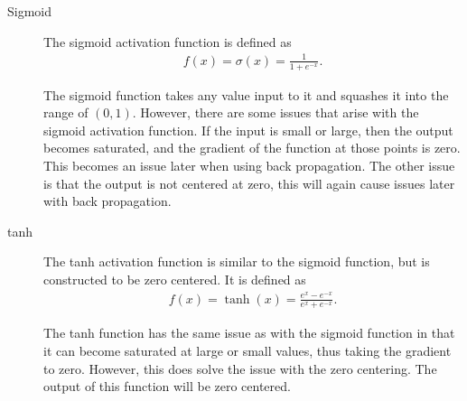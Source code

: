 \documentclass[10pt]{amsart}
\newenvironment{Figure}
{\par\medskip\noindent\minipage{\linewidth}}
{\endminipage\par\medskip}
\begin{document}
\begin{multicols}{2}
  \begin{description}
    \item[Sigmoid] The sigmoid activation function is defined as
      \begin{align*}
        f(x)=\sigma(x)=\frac{1}{1+e^{-x}}.
      \end{align*}
      \begin{Figure}
      \begin{center}
      \end{center}
      \label{fig:sigmoid}
      \end{Figure}
      The sigmoid function takes any value input to it and squashes it into the
      range of $(0,1)$. However, there are some issues that arise with the
      sigmoid activation function. If the input is small or large, then the
      output becomes saturated, and the gradient of the function at those
      points is zero. This becomes an issue later when using back propagation.
      The other issue is that the output is not centered at zero, this will
      again cause issues later with back propagation.

    \item[tanh] The tanh activation function is similar to the sigmoid
      function, but is constructed to be zero centered. It is defined as
      \begin{align*}
        f(x)=\tanh(x)=\frac{e^x-e^{-x}}{e^x+e^{-x}}.
      \end{align*}
      \begin{Figure}
      \begin{center}
      \end{center}
      \label{fig:tanh}
      \end{Figure}
      The tanh function has the same issue as with the sigmoid function in that
      it can become saturated at large or small values, thus taking the
      gradient to zero. However, this does solve the issue with the zero
      centering. The output of this function will be zero centered.


\end{description}
\end{multicols}
\end{document}
